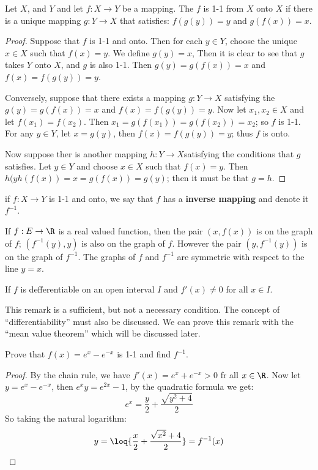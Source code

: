 \begin{theorem}
  Let $X$, and $Y$ and let $f:X \rightarrow Y$ be a mapping. The $f$ is 1-1 from $X$ onto $X$ if there is a unique mapping 
  $g:Y \rightarrow X$ that satisfies: $f(g(y))=y$ and $g(f(x))=x$.
\end{theorem}
\begin{proof}
  Suppose that $f$ is 1-1 and onto. Then for each $y \in Y$, choose the unique $x \in X$ such that $f(x)=y$. We define $
  g(y)=x$, Then it is clear to see that $g$ takes $Y$ onto $X$, and $g$ is also 1-1. Then $g(y)=g(f(x))=x$ and $f(x)=f(g(y))=y$.

  Conversely, suppose that there exists a mapping $g:Y \rightarrow X$ satisfying the $g(y)=g(f(x))=x$ and $f(x)=f(g(y))=y$. 
  Now let $x_1,x_2 \in X$ and let $f(x_1)=f(x_2)$. Then $x_1=g(f(x_1))=g(f(x_2))=x_2$; so $f$ is 1-1. For any $y \in Y$, 
  let $x=g(y)$, then $f(x)=f(g(y))=y$; thus $f$ is onto.

  Now suppose ther is another mapping $h:Y \rightarrow X$satisfying the conditions that $g$ satisfies. Let $y \in Y$ and 
  choose $x \in X$ such that $f(x)=y$. Then $h(yh(f(x))=x=g(f(x))=g(y)$; then it must be that $g=h$.
\end{proof}

\begin{definition}
  if $f:X \rightarrow Y$ is 1-1 and onto, we say that $f$ has a \textbf{inverse mapping} and denote it $f^{-1}$.
\end{definition}

If $f:E \rightarrow \R$ is a real valued function, then the pair $(x,f(x))$ is on the graph of $f$; $(f^{-1}(y),y)$ is also 
on the graph of $f$. However the pair $(y,f^{-1}(y))$ is on the graph of $f^{-1}$. The graphs of $f$ and $f^{-1}$ are 
symmetric with respect to the line $y=x$.

\begin{remark}
  If $f$ is defferentiable on an open interval $I$ and $f'(x) \neq 0$ for all $x \in I$.
\end{remark}

This remark is a sufficient, but not a necessary condition. The concept of ``differentiability'' must also be discussed. We 
can prove this remark with the ``mean value theorem'' which will be discussed later.

\begin{example}
  Prove that $f(x)=e^x-e^{-x}$ is 1-1 and find $f^{-1}$.
\end{example}
\begin{proof}
  By the chain rule, we have $f'(x)=e^x+e^{-x}>0$ fr all $x \in \R$. Now let $y=e^x-e^{-x}$, then $e^xy=e^{2x}-1$, by 
  the quadratic formula we get:
    \begin{equation*}
      e^x=\frac{y}{2}+\frac{\sqrt{y^2+4}}{2}
    \end{equation*}
  So taking the natural logarithm:
    \begin{equation*}
      y = \loq{\frac{x}{2}+\frac{\sqrt{x^2}+4}{2}} = f^{-1}(x)
    \end{equation*}
\end{proof}

